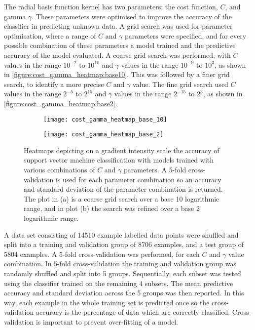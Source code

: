 The radial basis function kernel has two parameters: the cost function, $C$, and gamma $\gamma$. These parameters were optimised to improve the accuracy of the classifier in predicting unknown data. A grid search was used for parameter optimisation, where a range of $C$ and $\gamma$ parameters were specified, and for every possible combination of these parameters a model trained and the predictive accuracy of the model evaluated. A coarse grid search was performed, with $C$ values in the range $10^{-2}$ to $10^{10}$ and $\gamma$ values in the range $10^{-9}$ to $10^{3}$, as shown in \autoref{figure:cost_gamma_heatmap:base10}. This was followed by a finer grid search, to identify a more precise $C$ and $\gamma$ value. The fine grid search used $C$ values in the range $2^{-5}$ to $2^{15}$ and $\gamma$ values in the range $2^{-15}$ to $2^{3}$, as shown in \autoref{figure:cost_gamma_heatmap:base2}.
\begin{figure}[htbp]{}
	\centering
	\begin{subfigure}[b]{0.7\linewidth}
		\texttt{[image: cost\_gamma\_heatmap\_base\_10]}
		\caption{}
		\label{figure:cost_gamma_heatmap:base10}
	\end{subfigure}
	\begin{subfigure}[b]{0.7\linewidth}
		\texttt{[image: cost\_gamma\_heatmap\_base\_2]}
		\caption{}
		\label{figure:cost_gamma_heatmap:base2}
	\end{subfigure}
\caption[Radial basis function grid-search parameter optimisation]{Heatmaps depicting on a gradient intensity scale the accuracy of support vector machine classification with models trained with various combinations of $C$ and $\gamma$ parameters. A 5-fold cross-validation is used for each parameter combination so an accuracy and standard deviation of the parameter combination is returned. The plot in (a) is a coarse grid search over a base 10 logarithmic range, and in plot (b) the search was refined over a base 2 logarithmic range.}
\label{figure:cost_gamma_heatmap}
\end{figure}

A data set consisting of 14510 example labelled data points were shuffled and split into a training and validation group of 8706 examples, and a test group of 5804 examples. A 5-fold cross-validation was performed, for each $C$ and $\gamma$ value combination. In 5-fold cross-validation the training and validation group was randomly shuffled and split into 5 groups. Sequentially, each subset was tested using the classifier trained on the remaining 4 subsets. The mean predictive accuracy and standard deviation across the 5 groups was then reported. In this way, each example in the whole training set is predicted once so the cross-validation accuracy is the percentage of data which are correctly classified. Cross-validation is important to prevent over-fitting of a model.

